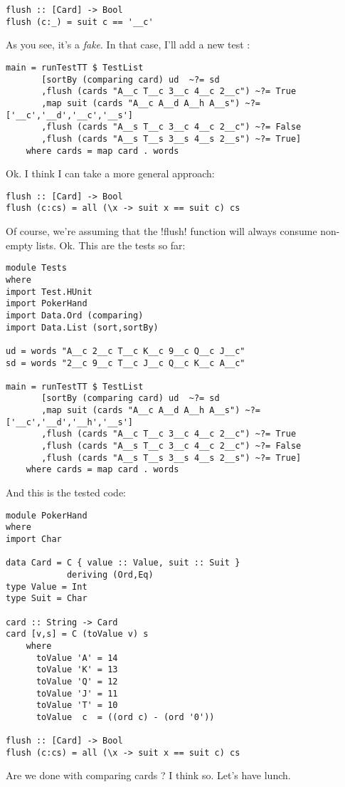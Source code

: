\begin{lstlisting}[frame=single]
flush :: [Card] -> Bool
flush (c:_) = suit c == '__c'
\end{lstlisting}
\success As you see, it's a \emph{fake}.
\lhN In that case, I'll add a new test :
\begin{lstlisting}[frame=single]
main = runTestTT $ TestList 
       [sortBy (comparing card) ud  ~?= sd
       ,flush (cards "A__c T__c 3__c 4__c 2__c") ~?= True
       ,map suit (cards "A__c A__d A__h A__s") ~?= ['__c','__d','__c','__s']
       ,flush (cards "A__s T__c 3__c 4__c 2__c") ~?= False
       ,flush (cards "A__s T__s 3__s 4__s 2__s") ~?= True]
    where cards = map card . words
\end{lstlisting} %
\hspace*{\fill}
\lhA \failure Ok. I think I can take a more general approach:
\begin{lstlisting}[frame=single]
flush :: [Card] -> Bool
flush (c:cs) = all (\x -> suit x == suit c) cs
\end{lstlisting}
\success Of course, we're assuming that the \il!flush! function will always consume non-empty lists. 
\lhN Ok. This are the tests so far:
\begin{lstlisting}[frame=single]
module Tests
where 
import Test.HUnit
import PokerHand
import Data.Ord (comparing)
import Data.List (sort,sortBy)

ud = words "A__c 2__c T__c K__c 9__c Q__c J__c"
sd = words "2__c 9__c T__c J__c Q__c K__c A__c"

main = runTestTT $ TestList 
       [sortBy (comparing card) ud  ~?= sd
       ,map suit (cards "A__c A__d A__h A__s") ~?= ['__c','__d','__h','__s']
       ,flush (cards "A__c T__c 3__c 4__c 2__c") ~?= True
       ,flush (cards "A__s T__c 3__c 4__c 2__c") ~?= False
       ,flush (cards "A__s T__s 3__s 4__s 2__s") ~?= True]
    where cards = map card . words
\end{lstlisting} %
\hspace*{\fill}
\lhA And this is the tested code:
\begin{lstlisting}[frame=single]
module PokerHand
where
import Char

data Card = C { value :: Value, suit :: Suit } 
            deriving (Ord,Eq)
type Value = Int
type Suit = Char

card :: String -> Card
card [v,s] = C (toValue v) s
    where 
      toValue 'A' = 14
      toValue 'K' = 13
      toValue 'Q' = 12
      toValue 'J' = 11
      toValue 'T' = 10
      toValue  c  = ((ord c) - (ord '0'))

flush :: [Card] -> Bool
flush (c:cs) = all (\x -> suit x == suit c) cs
\end{lstlisting}
\lhN Are we done with comparing cards ?
\lhA I think so. Let's have lunch.
\lhend
